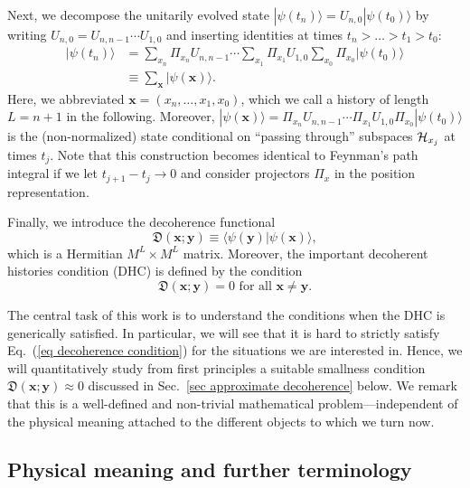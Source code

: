 \documentclass[pre,onecolumn,12pt,aps,longbibliography,nofootinbib]{revtex4-2}
\newcommand{\C}[1]{{\cal{#1}}}
\newcommand{\bb}[1]{\textbf{#1}}
\newcommand{\mf}[1]{{\mathfrak{#1}}}
\newcommand{\lr}[1]{{\langle {#1}\rangle}}
\newcommand{\new}[1]{#1}
\begin{document}
Next, we decompose the unitarily evolved state $|\psi(t_n)\rangle = U_{n,0}|\psi(t_0)\rangle$ by writing $U_{n,0} = U_{n,n-1}\cdots U_{1,0}$ and inserting identities at times $t_n > \dots > t_1 > t_0$:
\begin{align}
 |\psi(t_n)\rangle
 &= \sum_{x_n}\Pi_{x_n} U_{n,n-1}\cdots\sum_{x_1}\Pi_{x_1}U_{1,0}\sum_{x_0}\Pi_{x_0}|\psi(t_0)\rangle \nonumber \\
 &\equiv \sum_{\bb x}|\psi(\bb x)\rangle. \label{eq psi tot}
\end{align}
Here, we abbreviated $\bb x = (x_n,\dots,x_1,x_0)$, which we call a {history} of {length} $L=n+1$ in the following. Moreover, $|\psi(\bb x)\rangle = \Pi_{x_n} U_{n,n-1}\cdots\Pi_{x_1}U_{1,0}\Pi_{x_0}|\psi(t_0)\rangle$ is the (non-normalized) state conditional on ``passing through'' subspaces $\C H_{x_j}$ at times $t_j$. Note that this construction becomes identical to Feynman's path integral if we let $t_{j+1}-t_j\rightarrow0$ and consider projectors $\Pi_x$ in the position representation.

Finally, we introduce the {decoherence functional}
\begin{equation}\label{eq decoherence functional}
 \mf{D}(\bb x;\bb y) \equiv \lr{\psi(\bb y)|\psi(\bb x)},
\end{equation}
which is a Hermitian $M^L\times M^L$ matrix. Moreover, the important {decoherent histories condition} (DHC) is defined by the condition
\begin{equation}\label{eq decoherence condition}
 \mf{D}(\bb x;\bb y) = 0 \text{ for all } \bb x\neq\bb y.
\end{equation}

The central task of this work is to understand the conditions when the DHC is {generically} satisfied. In particular, we will see that it is hard to {strictly} satisfy Eq.~(\ref{eq decoherence condition}) for the situations we are interested in. Hence, we will {quantitatively} study from first principles a suitable smallness condition $\mf{D}(\bb x;\bb y) \approx 0$ discussed in Sec.~\ref{sec approximate decoherence} below. We remark that this is a well-defined and non-trivial mathematical problem---independent of the physical meaning attached to the different objects to which we turn now.

\subsection{\new{Physical meaning and further terminology}}
\end{document}
